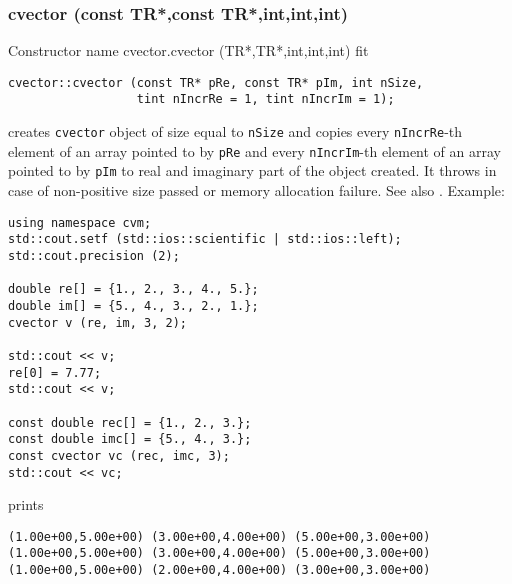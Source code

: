 \subsubsection{cvector (const TR*,const TR*,int,int,int)}
Constructor%
\pdfdest name {cvector.cvector (TR*,TR*,int,int,int)} fit
\begin{verbatim}
cvector::cvector (const TR* pRe, const TR* pIm, int nSize,
                  tint nIncrRe = 1, tint nIncrIm = 1);
\end{verbatim}
creates  \verb"cvector" object
of size equal to \verb"nSize" and copies 
every \verb"nIncrRe"-th element of an array  pointed to by \verb"pRe" 
and 
every \verb"nIncrIm"-th element of an array  pointed to by \verb"pIm"
to real and imaginary part of the object created.
It throws  
in case of non-positive size passed or memory allocation failure.
See also .
Example:
\begin{Verbatim}
using namespace cvm;
std::cout.setf (std::ios::scientific | std::ios::left);
std::cout.precision (2);

double re[] = {1., 2., 3., 4., 5.};
double im[] = {5., 4., 3., 2., 1.};
cvector v (re, im, 3, 2);

std::cout << v;
re[0] = 7.77;
std::cout << v;

const double rec[] = {1., 2., 3.};
const double imc[] = {5., 4., 3.};
const cvector vc (rec, imc, 3);
std::cout << vc;
\end{Verbatim}
prints
\begin{Verbatim}
(1.00e+00,5.00e+00) (3.00e+00,4.00e+00) (5.00e+00,3.00e+00)
(1.00e+00,5.00e+00) (3.00e+00,4.00e+00) (5.00e+00,3.00e+00)
(1.00e+00,5.00e+00) (2.00e+00,4.00e+00) (3.00e+00,3.00e+00)
\end{Verbatim}
\newpage



